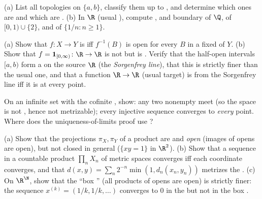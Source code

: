 \begin{exercise}[$\star$]\label{exo:b3:topology:1}
(a) List all topologies on $\{a, b\}$, classify them up to
, and determine which ones are  and which
are .
(b) In $\R$ (usual ), compute ,  and
boundary of $\Q$, of $[0,1) \cup \{2\}$, and of $\{1/n : n \geq
1\}$.
\end{exercise}

\begin{exercise}[$\star$]\label{exo:b3:topology:2}
(a) Show that $f\colon X \to Y$ is  iff $f^{-1}(B)$
is open for every $B$ in a fixed  of $Y$.
(b) Show that $f = \mathbf 1_{[0,\infty)} \colon \R \to \R$ is
not  but is \emph{}. Verify that the
half-open intervals $[a, b)$ form a  on the
source $\R$ (the \emph{Sorgenfrey line}), that this  is
strictly finer than the usual one, and that a function $\R \to
\R$ (usual target) is  from the Sorgenfrey line iff it
is  at every point.
\end{exercise}

\begin{exercise}[$\star$]\label{exo:b3:topology:3}
On an infinite set with the cofinite , show: any two
nonempty  meet (so the space is not , hence
not metrizable); every injective sequence converges to
\emph{every} point. Where does the uniqueness-of-limits proof
use ?
\end{exercise}

\begin{exercise}[$\star\star$]\label{exo:b3:topology:4}
(a) Show that the projections $\pi_X, \pi_Y$ of a product are
 and \emph{open} (images of opens are open), but not
closed in general ($\{xy = 1\}$ in $\R^2$).
(b) Show that a sequence in a countable product $\prod_n X_n$ of
metric spaces converges iff each coordinate converges, and that
$d(x, y) = \sum_n 2^{-n}\min(1, d_n(x_n, y_n))$ metrizes the
.
(c) On $\R^\N$, show that the ``box '' (all products of
opens are open) is strictly finer: the sequence
$x^{(k)} = (1/k, 1/k, \dots)$ converges to $0$ in the  but not in the box .
\end{exercise}

